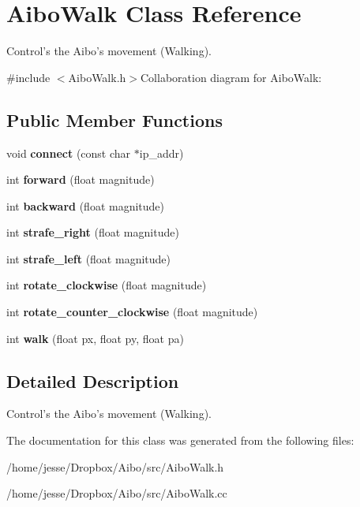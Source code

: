 \hypertarget{classAiboWalk}{
\section{AiboWalk Class Reference}
\label{classAiboWalk}
}


Control's the Aibo's movement (Walking).  


{\ttfamily \#include $<$AiboWalk.h$>$}Collaboration diagram for AiboWalk:\subsection*{Public Member Functions}
\begin{DoxyCompactItemize}
\item 
\hypertarget{classAiboWalk_a579e96df4e476be1232080d736f1cbf2}{
void {\bfseries connect} (const char $\ast$ip\_\-addr)}
\label{classAiboWalk_a579e96df4e476be1232080d736f1cbf2}

\item 
\hypertarget{classAiboWalk_ad0af8173899889a2493657027100f7f8}{
int {\bfseries forward} (float magnitude)}
\label{classAiboWalk_ad0af8173899889a2493657027100f7f8}

\item 
\hypertarget{classAiboWalk_a38821bc26f7140c31dfe72713a335fef}{
int {\bfseries backward} (float magnitude)}
\label{classAiboWalk_a38821bc26f7140c31dfe72713a335fef}

\item 
\hypertarget{classAiboWalk_a092f290abad06d247dab8d4d602c5f73}{
int {\bfseries strafe\_\-right} (float magnitude)}
\label{classAiboWalk_a092f290abad06d247dab8d4d602c5f73}

\item 
\hypertarget{classAiboWalk_a05599002238d8bf717655f2244a8d646}{
int {\bfseries strafe\_\-left} (float magnitude)}
\label{classAiboWalk_a05599002238d8bf717655f2244a8d646}

\item 
\hypertarget{classAiboWalk_a5f4b9c1911e4486f13f45a7afb4d8d4a}{
int {\bfseries rotate\_\-clockwise} (float magnitude)}
\label{classAiboWalk_a5f4b9c1911e4486f13f45a7afb4d8d4a}

\item 
\hypertarget{classAiboWalk_a93290f3abdbdbeb4482d91d0557f70ae}{
int {\bfseries rotate\_\-counter\_\-clockwise} (float magnitude)}
\label{classAiboWalk_a93290f3abdbdbeb4482d91d0557f70ae}

\item 
\hypertarget{classAiboWalk_ace69bca076d0091769b1af5ca7636953}{
int {\bfseries walk} (float px, float py, float pa)}
\label{classAiboWalk_ace69bca076d0091769b1af5ca7636953}

\end{DoxyCompactItemize}


\subsection{Detailed Description}
Control's the Aibo's movement (Walking). 

The documentation for this class was generated from the following files:\begin{DoxyCompactItemize}
\item 
/home/jesse/Dropbox/Aibo/src/AiboWalk.h\item 
/home/jesse/Dropbox/Aibo/src/AiboWalk.cc\end{DoxyCompactItemize}
